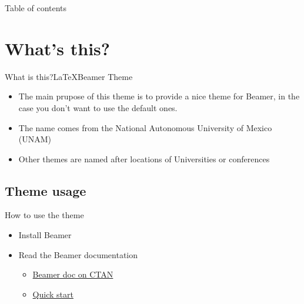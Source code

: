 
\begin{frame}[plain,t] %
\maketitle
\end{frame}


\begin{frame}{Table of contents}
    \tableofcontents
\end{frame}
  


\section{What's this?}
\begin{frame}{What is this?}{\LaTeX Beamer Theme}
    \begin{itemize}
    \item The main prupose of this theme is to provide a nice theme for Beamer, in the case you don't want to use the default ones.
    \item The name comes from the National Autonomous University of Mexico (UNAM)
    \item Other themes are named after locations of Universities or conferences
    \end{itemize}
\end{frame}



\subsection{Theme usage}

\begin{frame}[fragile]{How to use the theme}
\begin{itemize}
\item Install Beamer
\item Read the Beamer documentation
  \begin{itemize}
  \item \href{http://ctan.mirrors.hoobly.com/macros/latex/contrib/beamer/doc/beameruserguide.pdf}{Beamer doc on CTAN}
  \item \href{http://web.mit.edu/rsi/www/pdfs/beamer-tutorial.pdf}{Quick start}
  \end{itemize}
\end{itemize}
\end{frame}

